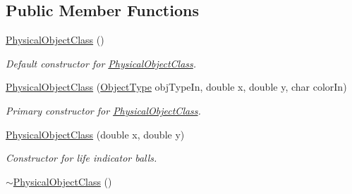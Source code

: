 \subsection*{Public Member Functions}
\begin{DoxyCompactItemize}
\item 
\hypertarget{classPhysicalObjectClass_a960979388739197bbf20ac18d08d7021}{\hyperlink{classPhysicalObjectClass_a960979388739197bbf20ac18d08d7021}{Physical\-Object\-Class} ()}\label{classPhysicalObjectClass_a960979388739197bbf20ac18d08d7021}

\begin{DoxyCompactList}\small\item\em Default constructor for \hyperlink{classPhysicalObjectClass}{Physical\-Object\-Class}. \end{DoxyCompactList}\item 
\hyperlink{classPhysicalObjectClass_a563152ccd0d7b8f1de8d4db32c2576da}{Physical\-Object\-Class} (\hyperlink{PhysicalObjectClass_8h_a842c5e2e69277690b064bf363c017980}{Object\-Type} obj\-Type\-In, double x, double y, char color\-In)
\begin{DoxyCompactList}\small\item\em Primary constructor for \hyperlink{classPhysicalObjectClass}{Physical\-Object\-Class}. \end{DoxyCompactList}\item 
\hyperlink{classPhysicalObjectClass_a0e940ca39a50d9534a32c55dd89085d1}{Physical\-Object\-Class} (double x, double y)
\begin{DoxyCompactList}\small\item\em Constructor for life indicator balls. \end{DoxyCompactList}\item 
\hypertarget{classPhysicalObjectClass_a97db381b4e2e357eeb8aeeb580d0b7bd}{\hyperlink{classPhysicalObjectClass_a97db381b4e2e357eeb8aeeb580d0b7bd}{$\sim$\-Physical\-Object\-Class} ()}\label{classPhysicalObjectClass_a97db381b4e2e357eeb8aeeb580d0b7bd}


\end{DoxyCompactItemize}
